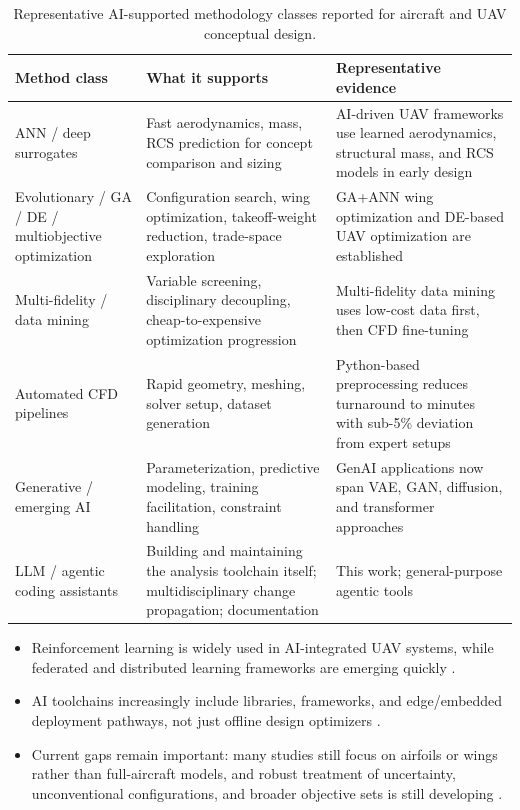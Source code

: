 \begin{table}[htbp]
\centering
\caption{Representative AI-supported methodology classes reported for
aircraft and UAV conceptual design.}
\label{tab:methodclasses}
\small
\begin{tabularx}{\textwidth}{@{}lXX@{}}
\toprule
\textbf{Method class} & \textbf{What it supports} &
\textbf{Representative evidence} \\
\midrule
ANN / deep surrogates &
Fast aerodynamics, mass, RCS prediction for concept comparison and
sizing &
AI-driven UAV frameworks use learned aerodynamics, structural mass,
and RCS models in early design \citep{karali2024surrogate} \\
\addlinespace
Evolutionary / GA / DE / multiobjective optimization &
Configuration search, wing optimization, takeoff-weight reduction,
trade-space exploration &
GA{+}ANN wing optimization and DE-based UAV optimization are
established \citep{boutemedjet2019,komarov2024} \\
\addlinespace
Multi-fidelity / data mining &
Variable screening, disciplinary decoupling, cheap-to-expensive
optimization progression &
Multi-fidelity data mining uses low-cost data first, then CFD
fine-tuning \citep{leng2024} \\
\addlinespace
Automated CFD pipelines &
Rapid geometry, meshing, solver setup, dataset generation &
Python-based preprocessing reduces turnaround to minutes with
sub-5\% deviation from expert setups \citep{pliakos2025} \\
\addlinespace
Generative / emerging AI &
Parameterization, predictive modeling, training facilitation,
constraint handling &
GenAI applications now span VAE, GAN, diffusion, and transformer
approaches \citep{du2026} \\
\addlinespace
LLM / agentic coding assistants &
Building and maintaining the analysis toolchain itself;
multidisciplinary change propagation; documentation &
This work; general-purpose agentic tools \citep{anthropic2025claudecode} \\
\bottomrule
\end{tabularx}
\end{table}

\begin{itemize}[nosep]
\item Reinforcement learning is widely used in AI-integrated UAV
  systems, while federated and distributed learning frameworks are
  emerging quickly \citep{sai2023}.
\item AI toolchains increasingly include libraries, frameworks, and
  edge/embedded deployment pathways, not just offline design
  optimizers \citep{sai2023,mcenroe2022}.
\item Current gaps remain important: many studies still focus on
  airfoils or wings rather than full-aircraft models, and robust
  treatment of uncertainty, unconventional configurations, and broader
  objective sets is still developing
  \citep{karali2024surrogate,wang2023,lukyanov2024}.
\end{itemize}

